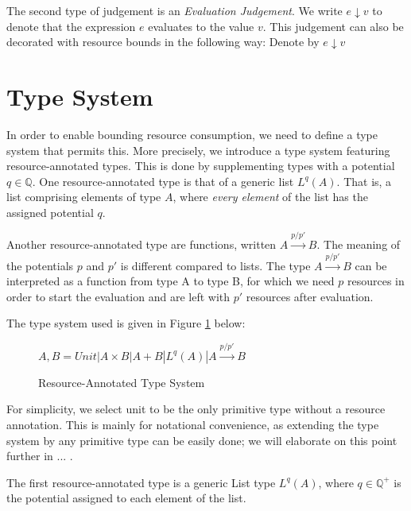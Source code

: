  The second type of judgement is an \emph{Evaluation Judgement}. We write \(e \downarrow v\) to denote that the expression \(e\) evaluates to the value \(v\). This judgement can also be decorated with resource bounds in the following way: Denote by \(e \downarrow v\)

\section{Type System} \label{chap:type-system}
In order to enable bounding resource consumption, we need to define a type system that permits this. More precisely, we introduce a type system featuring resource-annotated types. This is done by supplementing types with a potential \(q \in \mathbb{Q}\). 
One resource-annotated type is that of a generic list \(L^q(A)\). That is, a list comprising elements of type \(A\), where \emph{every element} of the list has the assigned potential \(q\).

Another resource-annotated type are functions, written \(A \xrightarrow{p/p'} B\). The meaning of the potentials \(p\) and \(p'\) is different compared to lists. The type \(A \xrightarrow{p/p'} B\) can be interpreted as a function from type A to type B, for which we need \(p\) resources in order to start the evaluation and are left with \(p'\) resources after evaluation. 

The type system used is given in Figure \ref{fig:type-system} below:

\begin{figure}[H]
\centering
\(A,B = Unit | A \times B | A + B | L^q(A) | A \xrightarrow{p/p'} B\)
\caption{Resource-Annotated Type System}
\label{fig:type-system}
\end{figure}

For simplicity, we select unit to be the only primitive type without a resource annotation. This is mainly for notational convenience, as extending the type system by any primitive type can be easily done; we will elaborate on this point further in ... .

The first resource-annotated type is a generic List type \(L^q(A)\), where \(q \in \mathbb{Q}^+\) is the potential assigned to each element of the list. 
